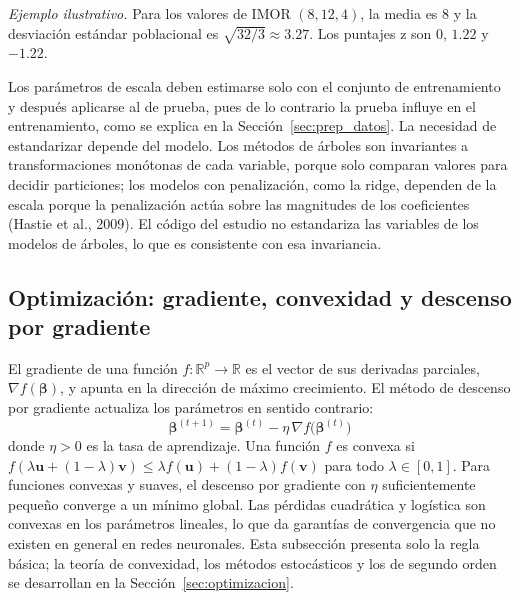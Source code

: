 \textit{Ejemplo ilustrativo.} Para los valores de IMOR $(8,12,4)$, la media es $8$ y la desviación estándar poblacional es $\sqrt{32/3}\approx 3.27$. Los puntajes z son $0$, $1.22$ y $-1.22$.

Los parámetros de escala deben estimarse solo con el conjunto de entrenamiento y después aplicarse al de prueba, pues de lo contrario la prueba influye en el entrenamiento, como se explica en la Sección~\ref{sec:prep_datos}. La necesidad de estandarizar depende del modelo. Los métodos de árboles son invariantes a transformaciones monótonas de cada variable, porque solo comparan valores para decidir particiones; los modelos con penalización, como la ridge, dependen de la escala porque la penalización actúa sobre las magnitudes de los coeficientes (Hastie et al., 2009). El código del estudio no estandariza las variables de los modelos de árboles, lo que es consistente con esa invariancia.

\subsection{Optimización: gradiente, convexidad y descenso por gradiente}
El gradiente de una función $f:\mathbb{R}^p\to\mathbb{R}$ es el vector de sus derivadas parciales, $\nabla f(\boldsymbol{\beta})$, y apunta en la dirección de máximo crecimiento. El método de descenso por gradiente actualiza los parámetros en sentido contrario:
\begin{equation}
\boldsymbol{\beta}^{(t+1)} = \boldsymbol{\beta}^{(t)} - \eta\,\nabla f\big(\boldsymbol{\beta}^{(t)}\big)
\label{eq:descenso}
\end{equation}
donde $\eta>0$ es la tasa de aprendizaje. Una función $f$ es convexa si $f(\lambda\mathbf{u}+(1-\lambda)\mathbf{v})\leq \lambda f(\mathbf{u})+(1-\lambda)f(\mathbf{v})$ para todo $\lambda\in[0,1]$. Para funciones convexas y suaves, el descenso por gradiente con $\eta$ suficientemente pequeño converge a un mínimo global. Las pérdidas cuadrática y logística son convexas en los parámetros lineales, lo que da garantías de convergencia que no existen en general en redes neuronales. Esta subsección presenta solo la regla básica; la teoría de convexidad, los métodos estocásticos y los de segundo orden se desarrollan en la Sección~\ref{sec:optimizacion}.

